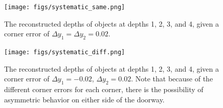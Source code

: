 \documentclass[11pt]{article}
\begin{document}
\begin{figure}
\centering
\texttt{[image: figs/systematic\_same.png]}
\caption{The reconstructed depths of objects at depths 1, 2, 3, and 4, given a corner error of $\Delta y_1 = \Delta y_2 = 0.02$. \label{fig:systematic_same}}
\end{figure}

\begin{figure}
\centering
\texttt{[image: figs/systematic\_diff.png]}
\caption{The reconstructed depths of objects at depths 1, 2, 3, and 4, given a corner error of $\Delta y_1 = -0.02$, $\Delta y_2 = 0.02$. Note that because of the different corner errors for each corner, there is the possibility of asymmetric behavior on either side of the doorway. \label{fig:systematic_diff}}
\end{figure}
\end{document}
